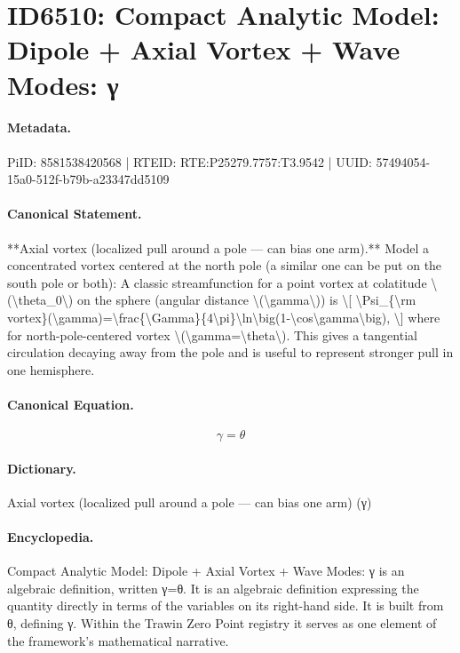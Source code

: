 \section*{ID6510: Compact Analytic Model: Dipole + Axial Vortex + Wave Modes: γ}
\paragraph{Metadata.}
PiID: 8581538420568 | RTEID: RTE:P25279.7757:T3.9542 | UUID: 57494054-15a0-512f-b79b-a23347dd5109

\paragraph{Canonical Statement.}
**Axial vortex (localized pull around a pole — can bias one arm).** Model a concentrated vortex centered at the north pole (a similar one can be put on the south pole or both): A classic streamfunction for a point vortex at colatitude \textbackslash{}(\textbackslash{}theta\_0\textbackslash{}) on the sphere (angular distance \textbackslash{}(\textbackslash{}gamma\textbackslash{})) is \textbackslash{}[ \textbackslash{}Psi\_\{\textbackslash{}rm vortex\}(\textbackslash{}gamma)=\textbackslash{}frac\{\textbackslash{}Gamma\}\{4\textbackslash{}pi\}\textbackslash{}ln\textbackslash{}big(1-\textbackslash{}cos\textbackslash{}gamma\textbackslash{}big), \textbackslash{}] where for north-pole-centered vortex \textbackslash{}(\textbackslash{}gamma=\textbackslash{}theta\textbackslash{}). This gives a tangential circulation decaying away from the pole and is useful to represent stronger pull in one hemisphere.

\paragraph{Canonical Equation.}
\[
\gamma=\theta
\]

\paragraph{Dictionary.}
Axial vortex (localized pull around a pole — can bias one arm) (γ)

\paragraph{Encyclopedia.}
Compact Analytic Model: Dipole + Axial Vortex + Wave Modes: γ is an algebraic definition, written γ=θ. It is an algebraic definition expressing the quantity directly in terms of the variables on its right-hand side. It is built from θ, defining γ. Within the Trawin Zero Point registry it serves as one element of the framework's mathematical narrative.
